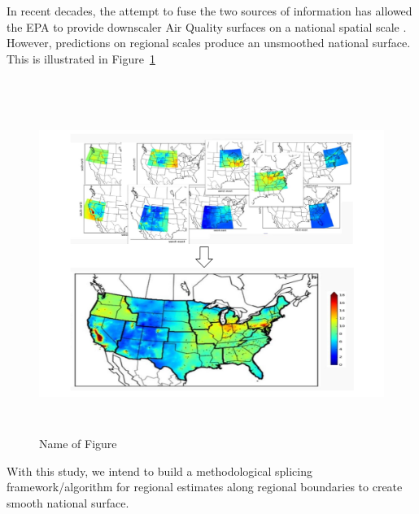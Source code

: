\documentclass[10pt]{article}
\begin{document}
\justify
In recent decades, the attempt to fuse the two sources of information has allowed the EPA to provide downscaler Air Quality surfaces on a national spatial scale \cite{berrocal2010bivariate, berrocal2010spatio}.  However, predictions on regional scales produce an unsmoothed national surface.  This is illustrated in Figure~\ref{fig:Regional overlapping}\\~
\begin{figure}[!ht]
	\centering
	\vspace{-5em}
	\includegraphics[width= 16cm, scale = 1, height = 11cm]{Image_1}
	\caption{Name of Figure}
	\label{fig:Regional overlapping}
\end{figure}

\justify
With this study, we intend to build a methodological splicing framework/algorithm for regional estimates along regional boundaries to create smooth national surface.

\end{document}
